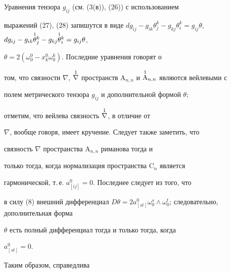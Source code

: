 Уравнения тензора $g_{i j}$ (см. (3(в)), (26)) с использованием 


выражений (27), (28) запишутся в виде $d g_{i j}-g_{i 


k}\theta^k_j-g_{k j}\theta^k_i=g_{i j}\theta$, $d g_{i j}-g_{i 


k}\up{1}{\theta}{}^k_j-g_{k j}\up{1}{\theta}{}^k_i=g_{i j}\theta$, 


$\theta=2(\omega^0_0-x^0_k\omega^k_0)$. Последние уравнения говорят о 


том, что связности $\nabla$, $\up{1}{\nabla}{}$ пространств $\mathrm 


A_{n,n}$ и $\up{1}{\mathrm A}{}_{n,n}$ являются вейлевыми \cite{5} с 


полем метрического тензора $g_{i j}$ и дополнительной формой $\theta$; 


отметим, что вейлева связность $\overset{1}{\nabla}{}{}$, в отличие от 


$\nabla$, вообще говоря, имеет кручение. Следует также заметить, что 


связность $\nabla$ пространства $\mathrm A_{n,n}$ риманова тогда и 


только тогда, когда нормализация пространства $\mathrm C_n$ является 


гармонической, т.\,е. $a{}^0_{[i j]}=0$. Последнее следует из того, что 


в силу (8) внешний дифференциал $D\theta=2a{}^0_{[s 


t]}\omega^s_0\wedge\omega^t_0$; следовательно, дополнительная форма 


$\theta$ есть полный дифференциал тогда и только тогда, когда 


$a{}^0_{[s t]}=0$. 


 


Таким образом, справедлива 


 


